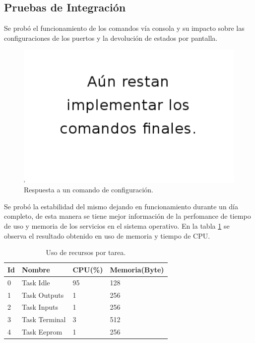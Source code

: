 \subsection{ Pruebas de Integración }

Se probó el funcionamiento de los comandos vía consola y su impacto sobre las configuraciones de los puertos y la devolución de estados por pantalla. 

\begin{figure}[h!]
	\centering
	\includegraphics[width=1.0\textwidth]{Figures/Cap_4/imagen_mensaje}
	\caption{Respuesta a un comando de configuración.}
	\label{fig:term_Configuracion}
\end{figure}

Se probó la estabilidad del mismo dejando en funcionamiento durante un día completo, de esta manera se tiene mejor información de la perfomance de tiempo de uso y memoria de los servicios en el sistema operativo. En la tabla \ref{tabla_rendimiento} se observa el resultado obtenido en uso de memoria y tiempo de CPU.

\begin{table}[h!]
\centering
\begin{tabular}{ m{1.0cm}|m{3.0cm}|m{2.0cm}|m{2.5cm} }\hline
{\textbf{Id}} &{\textbf{Nombre}} & {\textbf{CPU(\%)}} & {\textbf{Memoria(Byte)}}\\ \hline
{0} & {Task Idle} & { 95 } & { 128 }\\ \hline
{1} & {Task Outputs} & { 1 } & { 256 }\\ \hline
{2} & {Task Inputs}  & { 1 } & { 256 }\\ \hline
{3} & {Task Terminal} & { 3 } & { 512 }\\ \hline
{4} & {Task Eeprom } & { 1 } & { 256 }\\ \hline
\end{tabular}
\caption{Uso de recursos por tarea.}
\label{tabla_rendimiento}
\end{table}

